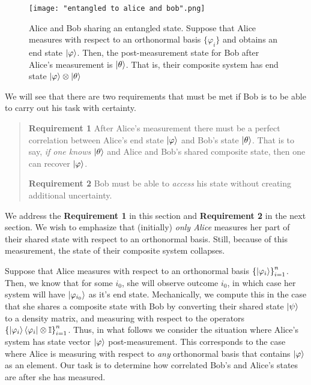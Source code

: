 \begin{figure}[h]
    \centering
    \texttt{[image: "entangled to alice and bob".png]}
    \caption{Alice and Bob sharing an entangled state. Suppose that Alice measures with respect to an orthonormal basis $\{\varphi_i\}$ and obtains an end state $\ket{\varphi}$.  Then, the post-measurement state for Bob after Alice's measurement is $\ket{\theta}$. That is, their composite system has end state $\ket{\varphi}\otimes\ket{\theta}$}
    \label{fig:entanglement}
\end{figure}


We will see that there are two requirements that must be met if Bob is to be able to carry out his task with certainty.

\begin{quote} 
    {\bf{Requirement 1}} After Alice's measurement there must be a perfect correlation between Alice's end state $\ket{\varphi}$ and Bob's state $\ket{\theta}$.  That is to say, {\emph{if one knows}} $\ket{\theta}$ and Alice and Bob's shared composite state, then one can recover $\ket{\varphi}$.
    \medskip
    
    {\bf{Requirement 2}} Bob must be able to {\emph{access}} his state without creating additional uncertainty.
   
\end{quote}


We address the {\bf{Requirement 1}} in this section and {\bf{Requirement 2}} in the next section.  We wish to emphasize that (initially) {\emph{only Alice}} measures her part of their shared state with respect to an orthonormal basis.  Still, because of this measurement, the state of their composite system collapses.  


Suppose that Alice measures with respect to an orthonormal basis ${\{\ket{\varphi_i}\}}_{i=1}^{n}$.  Then, we know that for some $i_0$, she will observe outcome $i_0$, in which case her system will have $\ket{\varphi_{i_0}}$ as it's end state. Mechanically, we compute this in the case that she shares a composite state with Bob by converting their shared state $\ket{\psi}$ to a density matrix, and measuring with respect to the operators ${\{\ket{\varphi_i}\bra{\varphi_i}\otimes \mathbb{I} \}}_{i=1}^n$.  Thus, in what follows we consider the situation where Alice's system has state vector $\ket{\varphi}$ post-measurement.  This corresponds to the case where Alice is measuring with respect to {\emph{any}} orthonormal basis that contains $\ket{\varphi}$ as an element. Our task is to determine how correlated Bob's and Alice's states are after she has measured.  


